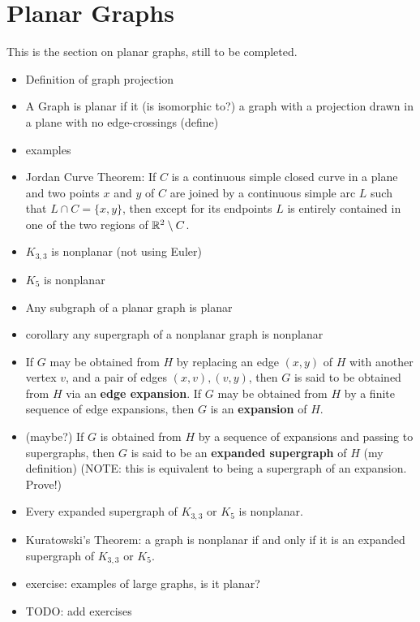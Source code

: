 \section{Planar Graphs} \label{sec:planar}

This is the section on planar graphs, still to be completed.

\begin{itemize}
    \item Definition of graph projection
    \item A Graph is planar if it (is isomorphic to?) a graph with a projection drawn in a plane with no edge-crossings (define)
    \item examples
    \item Jordan Curve Theorem: If $C$ is a continuous simple closed curve in a plane and two points $x$ and $y$ of $C$ are joined by a continuous simple arc $L$ such that $L \cap C = \{x, y\}$, then except for its endpoints $L$ is entirely contained in one of the two regions of $\mathbb{R}^2 \setminus C$.
    \item $K_{3,3}$ is nonplanar (not using Euler)
    \item $K_5$ is nonplanar
    \item Any subgraph of a planar graph is planar
    \item corollary any supergraph of a nonplanar graph is nonplanar
    \item If $G$ may be obtained from $H$ by replacing an edge $(x, y)$ of $H$ with another vertex $v$, and a pair of edges $(x, v), (v, y)$, then $G$ is said to be obtained from $H$ via an \textbf{edge expansion}.  If $G$ may be obtained from $H$ by a finite sequence of edge expansions, then $G$ is an \textbf{expansion} of $H$.
    \item (maybe?) If $G$ is obtained from $H$ by a sequence of expansions and passing to supergraphs, then $G$ is said to be an \textbf{expanded supergraph} of $H$ (my definition) (NOTE: this is equivalent to being a supergraph of an expansion.  Prove!)
    \item Every expanded supergraph of $K_{3,3}$ or $K_5$ is nonplanar.
    \item Kuratowski's Theorem: a graph is nonplanar if and only if it is an expanded supergraph of $K_{3,3}$ or $K_5$.
    \item exercise: examples of large graphs, is it planar?

    \item TODO: add exercises
\end{itemize}

